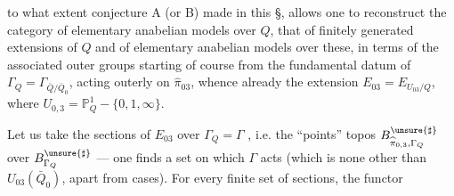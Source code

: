to what extent conjecture A (or B) made in this §, allows one to reconstruct the category of elementary anabelian models over $Q$,  that of finitely generated extensions of $Q$ and of elementary anabelian models over these, in terms of the associated outer groups  starting of course from the fundamental datum of $\Gamma_Q=\Gamma_{\bar Q/\bar Q_0}$, acting outerly on $\widehat\pi_{03}$, whence already the extension $E_{03}=E_{U_{03}/Q}$, where $U_{0,3}=\mathbb P^1_Q-\{0,1,\infty\}$.

Let us take the  sections of $E_{03}$ over $\Gamma_Q=\Gamma$ , i.e. the ``points''   topos $B_{\widehat\pi_{0,3},\Gamma_Q}^{\unsure{\sharp}}$ over $B_{\Gamma_Q}^{\unsure{\sharp}}$ — one finds a set on which $\Gamma$ acts (which is none other than $U_{03}(\bar Q_0)$, apart from  cases). For every finite set  of sections,  the functor
